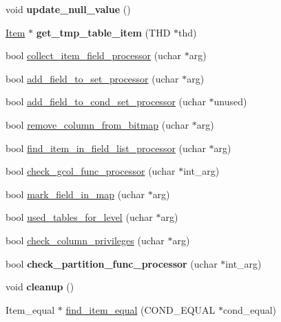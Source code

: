 \begin{DoxyCompactItemize}
void {\bfseries update\+\_\+null\+\_\+value} ()
\item 
\mbox{\label{classItem__field_a626f4e6493cf2ff011f4b4fa9723d266}} 
\mbox{\hyperlink{classItem}{Item}} $\ast$ {\bfseries get\+\_\+tmp\+\_\+table\+\_\+item} (T\+HD $\ast$thd)
\item 
bool \mbox{\hyperlink{classItem__field_aa44b1b1e7f82487a0e6ea0f3c777d221}{collect\+\_\+item\+\_\+field\+\_\+processor}} (uchar $\ast$arg)
\item 
bool \mbox{\hyperlink{classItem__field_accdc70183bdbc1279be2ef8d3f0ab042}{add\+\_\+field\+\_\+to\+\_\+set\+\_\+processor}} (uchar $\ast$arg)
\item 
bool \mbox{\hyperlink{classItem__field_a9296d0ae378518ab8aed6c1e9c7a3bf9}{add\+\_\+field\+\_\+to\+\_\+cond\+\_\+set\+\_\+processor}} (uchar $\ast$unused)
\item 
bool \mbox{\hyperlink{classItem__field_a4df6afee14222812ccadfe9b1e32d9ee}{remove\+\_\+column\+\_\+from\+\_\+bitmap}} (uchar $\ast$arg)
\item 
bool \mbox{\hyperlink{classItem__field_a067634a6cb5c51fb8a68a91fd1c45b36}{find\+\_\+item\+\_\+in\+\_\+field\+\_\+list\+\_\+processor}} (uchar $\ast$arg)
\item 
bool \mbox{\hyperlink{classItem__field_a9a5288fcbc34ac4bda07a8e11c86269c}{check\+\_\+gcol\+\_\+func\+\_\+processor}} (uchar $\ast$int\+\_\+arg)
\item 
bool \mbox{\hyperlink{classItem__field_a45e7c96e69477dfa28d0004321285cb8}{mark\+\_\+field\+\_\+in\+\_\+map}} (uchar $\ast$arg)
\item 
bool \mbox{\hyperlink{classItem__field_a29900919e790061d19f828b4baf5fc25}{used\+\_\+tables\+\_\+for\+\_\+level}} (uchar $\ast$arg)
\item 
bool \mbox{\hyperlink{classItem__field_a221c5bbedbd2f9a64c1e60863401fb09}{check\+\_\+column\+\_\+privileges}} (uchar $\ast$arg)
\item 
\mbox{\label{classItem__field_a997752b843dd8925955f355e30283f16}} 
bool {\bfseries check\+\_\+partition\+\_\+func\+\_\+processor} (uchar $\ast$int\+\_\+arg)
\item 
\mbox{\label{classItem__field_af122e778539f08a51fff09db7408847c}} 
void {\bfseries cleanup} ()
\item 
Item\+\_\+equal $\ast$ \mbox{\hyperlink{classItem__field_ae8d49460f4a67ebb4e116418219581fc}{find\+\_\+item\+\_\+equal}} (C\+O\+N\+D\+\_\+\+E\+Q\+U\+AL $\ast$cond\+\_\+equal)

\end{DoxyCompactItemize}
